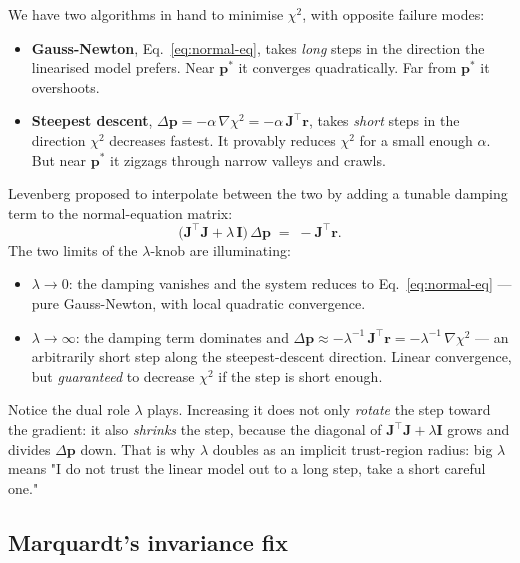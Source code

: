\documentclass[11pt,a4paper]{article}
\newcommand{\Jac}{\mathbf{J}}
\newcommand{\pv}{\mathbf{p}}                          %
\newcommand{\rv}{\mathbf{r}}                          %
\begin{document}
We have two algorithms in hand to minimise $\chi^2$, with opposite
failure modes:
\begin{itemize}[leftmargin=*,nosep]
  \item \textbf{Gauss-Newton}, Eq.~\eqref{eq:normal-eq}, takes
        \emph{long} steps in the direction the linearised model
        prefers. Near $\pv^*$ it converges quadratically. Far from
        $\pv^*$ it overshoots.
  \item \textbf{Steepest descent}, $\Delta\pv = -\alpha\,\nabla\chi^2
        = -\alpha\,\Jac^{\!\top}\rv$, takes \emph{short} steps in
        the direction $\chi^2$ decreases fastest. It provably
        reduces $\chi^2$ for a small enough $\alpha$. But near
        $\pv^*$ it zigzags through narrow valleys and crawls.
\end{itemize}
Levenberg \cite{Levenberg44} proposed to interpolate between the
two by adding a tunable damping term to the normal-equation matrix:
\begin{equation}
   \bigl(\Jac^{\!\top}\Jac + \lambda\,\mathbf{I}\bigr)\,\Delta\pv
   \;=\; -\Jac^{\!\top}\rv.
   \label{eq:levenberg}
\end{equation}
The two limits of the $\lambda$-knob are illuminating:
\begin{itemize}[leftmargin=*,nosep]
  \item $\lambda \to 0$: the damping vanishes and the system reduces
        to Eq.~\eqref{eq:normal-eq} --- pure Gauss-Newton, with
        local quadratic convergence.
  \item $\lambda \to \infty$: the damping term dominates and
        $\Delta\pv \approx -\lambda^{-1}\,\Jac^{\!\top}\rv =
        -\lambda^{-1}\,\nabla\chi^2$ --- an arbitrarily short step
        along the steepest-descent direction. Linear convergence,
        but \emph{guaranteed} to decrease $\chi^2$ if the step is
        short enough.
\end{itemize}
Notice the dual role $\lambda$ plays. Increasing it does not only
\emph{rotate} the step toward the gradient: it also \emph{shrinks}
the step, because the diagonal of $\Jac^{\!\top}\Jac +
\lambda\mathbf{I}$ grows and divides $\Delta\pv$ down. That is why
$\lambda$ doubles as an implicit trust-region radius: big $\lambda$
means "I do not trust the linear model out to a long step, take a
short careful one."

\subsection{Marquardt's invariance fix}
\end{document}
